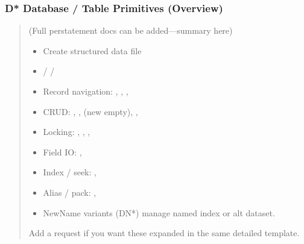 \documentclass[letterpaper,10pt,english]{sphinxmanual}
\begin{document}
\subsubsection{D* Database / Table Primitives (Overview)}
\label{\detokenize{ppl:d-database-table-primitives-overview}}\begin{quote}

\sphinxAtStartPar
(Full per\sphinxhyphen{}statement docs can be added—summary here)
\begin{itemize}
\item {} 
\sphinxAtStartPar
{} \textendash{} Create structured data file

\item {} 
\sphinxAtStartPar
{} /  / 

\item {} 
\sphinxAtStartPar
Record navigation: , , , 

\item {} 
\sphinxAtStartPar
CRUD: , ,  (new empty), , 

\item {} 
\sphinxAtStartPar
Locking: , , , 

\item {} 
\sphinxAtStartPar
Field IO: , 

\item {} 
\sphinxAtStartPar
Index / seek: , 

\item {} 
\sphinxAtStartPar
Alias / pack: , 

\item {} 
\sphinxAtStartPar
NewName variants (DN*) manage named index or alt dataset.

\end{itemize}

\sphinxAtStartPar
Add a request if you want these expanded in the same detailed template.
\end{quote}



\renewcommand{\indexname}{Index}
\printindex
\end{document}
